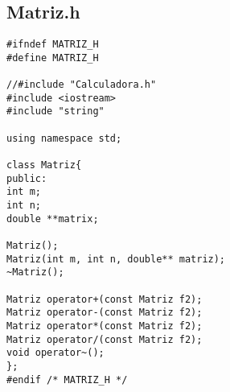 \documentclass[11pt]{article}
\begin{document}
\subsection{Matriz.h}
\begin{lstlisting}
#ifndef MATRIZ_H
#define MATRIZ_H

//#include "Calculadora.h"
#include <iostream>
#include "string"

using namespace std;

class Matriz{
public:	
int m;
int n;	
double **matrix;

Matriz();	
Matriz(int m, int n, double** matriz);
~Matriz(); 

Matriz operator+(const Matriz f2);
Matriz operator-(const Matriz f2);
Matriz operator*(const Matriz f2);
Matriz operator/(const Matriz f2);
void operator~();
};
#endif /* MATRIZ_H */

\end{lstlisting}
\end{document}
